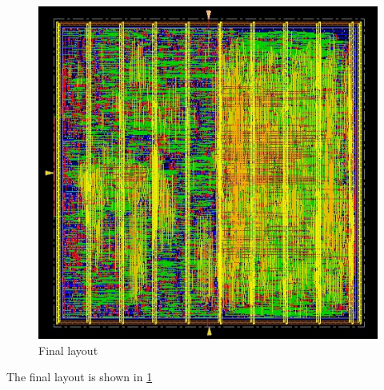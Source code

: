 \begin{figure}[ht]
	\centering
	\includegraphics[width=\textwidth]{chapters/figures/9.Post_PostRouteOPT.jpg} 
	\caption{Final layout}
	\label{fig:final_design}  %
	\end{figure}

The final layout is shown in \ref{fig:final_design}









